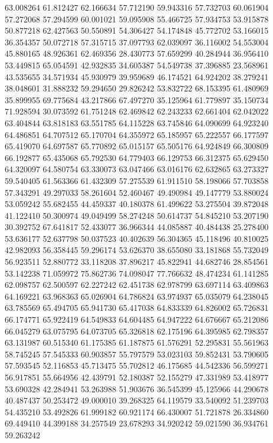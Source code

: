 63.008264
61.812427
62.166634
57.712190
59.943316
57.732703
60.061904
57.272068
57.294599
60.001021
59.095908
55.466725
57.934753
53.915878
50.877218
62.427563
50.550891
54.306427
54.174848
45.772702
53.166015
36.354357
50.072718
57.315715
37.097793
62.039097
36.116002
54.553004
45.880165
48.926361
62.469356
28.430773
57.659299
40.284944
36.956410
53.449815
65.054591
42.932835
34.605387
54.549738
37.396885
23.568961
43.535655
34.571934
45.930979
39.959689
46.174521
64.924202
38.279241
38.048601
31.888232
59.294650
29.826242
53.832722
68.153395
61.480969
35.899955
69.775684
43.217866
67.497270
35.125964
61.779897
35.150734
71.928594
30.073592
61.751248
62.469842
62.243233
62.661404
62.042022
63.404844
63.818183
63.551785
64.115228
63.745846
64.090699
64.923240
64.486851
64.707512
65.170704
64.355972
65.185957
65.222557
66.177597
65.419070
64.697587
65.770892
65.015157
65.505176
64.924849
66.300809
66.192877
65.435068
65.792530
64.779403
66.129753
66.312375
65.629450
64.320097
64.580754
63.330073
63.047466
63.016176
62.632865
63.273327
59.540405
61.563366
61.432309
57.275539
61.911510
58.198066
57.703858
57.343291
49.297033
58.261604
52.460467
49.490984
49.147779
53.880024
53.059242
55.682455
44.459337
40.180378
61.499622
53.275504
39.872048
41.122410
50.300974
49.049499
58.274248
50.614737
54.845210
53.207190
30.392752
67.641817
52.433077
36.966344
44.085887
40.484438
25.278400
53.636177
52.637798
50.037523
40.402639
56.304365
45.118496
40.810025
42.982093
56.358445
59.296174
53.626370
38.655080
33.181868
55.732049
56.923511
52.880772
33.118208
37.896217
45.822941
44.682746
28.854561
53.142238
71.059972
75.862736
74.098047
77.766632
48.474234
61.141285
62.098757
62.500597
62.227242
62.451738
62.978799
63.697114
63.409863
64.169221
63.968363
65.026904
64.786824
63.974937
65.035079
64.238045
63.785569
65.494705
65.941730
65.417038
64.833339
64.826002
65.726831
66.174771
65.922419
64.549833
64.604485
64.947222
64.676667
65.212086
66.045279
63.075795
64.073705
65.326818
62.175196
64.395985
62.798357
63.131987
60.515340
61.175385
61.187875
61.576291
52.295831
55.561963
58.745245
57.545333
60.903857
55.797579
53.023103
59.852431
53.790605
57.593545
52.116853
45.713475
55.702812
46.175685
44.542336
56.599271
56.917851
55.664956
42.439791
52.180387
52.155279
47.331989
53.418977
53.690328
42.284941
53.263988
51.903676
36.545399
45.125966
44.290678
40.487437
50.253472
49.000010
39.268325
64.119579
33.540092
51.239703
54.435210
53.492826
61.999182
60.921174
66.430007
51.721878
26.334860
69.449410
44.399188
34.257549
23.678293
34.920242
59.021590
36.934761
59.263242
